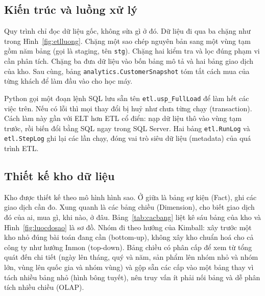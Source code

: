 \subsection{Kiến trúc và luồng xử lý}
Quy trình chỉ đọc dữ liệu gốc, không sửa gì ở đó. Dữ liệu đi qua ba chặng như trong Hình~\ref{fig:etlluong}. Chặng một sao chép nguyên bản sang một vùng tạm gồm năm bảng (gọi là staging, tên \texttt{stg}). Chặng hai kiểm tra và lọc đúng phạm vi cần phân tích. Chặng ba đưa dữ liệu vào bốn bảng mô tả và hai bảng giao dịch của kho. Sau cùng, bảng \texttt{analytics.\allowbreak CustomerSnapshot} tóm tắt cách mua của từng khách để làm đầu vào cho học máy.

Python gọi một đoạn lệnh SQL lưu sẵn tên \texttt{etl.usp\_\allowbreak FullLoad} để làm hết các việc trên. Nếu có lỗi thì mọi thay đổi bị huỷ như chưa từng chạy (transaction). Cách làm này gần với ELT hơn ETL cổ điển: nạp dữ liệu thô vào vùng tạm trước, rồi biến đổi bằng SQL ngay trong SQL Server. Hai bảng \texttt{etl.RunLog} và \texttt{etl.StepLog} ghi lại các lần chạy, đóng vai trò siêu dữ liệu (metadata) của quá trình ETL.

\subsection{Thiết kế kho dữ liệu}
Kho được thiết kế theo mô hình hình sao. Ở giữa là bảng sự kiện (Fact), ghi các giao dịch cần đo. Xung quanh là các bảng chiều (Dimension), cho biết giao dịch đó của ai, mua gì, khi nào, ở đâu. Bảng~\ref{tab:cacbang} liệt kê sáu bảng của kho và Hình~\ref{fig:luocdosao} là sơ đồ. Nhóm đi theo hướng của Kimball: xây trước một kho nhỏ đúng bài toán đang cần (bottom-up), không xây kho chuẩn hoá cho cả công ty như hướng Inmon (top-down). Bảng chiều có phân cấp để xem từ tổng quát đến chi tiết (ngày lên tháng, quý và năm, sản phẩm lên nhóm nhỏ và nhóm lớn, vùng lên quốc gia và nhóm vùng) và gộp sẵn các cấp vào một bảng thay vì tách nhiều bảng nhỏ (hình bông tuyết), nên truy vấn ít phải nối bảng và dễ phân tích nhiều chiều (OLAP).

\begin{table}[H]
\centering
\caption{Sáu bảng của kho \texttt{CompanyX\_DW} và số bản ghi sau ETL}
\label{tab:cacbang}
\small

\end{table}

